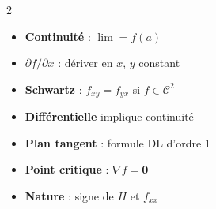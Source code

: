 \documentclass[10pt,a4paper]{article}
\begin{document}
\begin{multicols}{2}
\begin{grisbox}
\begin{itemize}[leftmargin=1em,itemsep=2pt]
  \item \textbf{Continuité} : $\lim = f(a)$
  \item \textbf{$\partial f/\partial x$} : dériver en $x$, $y$ constant
  \item \textbf{Schwartz} : $f_{xy}=f_{yx}$ si $f\in\mathcal{C}^2$
  \item \textbf{Différentielle} implique continuité
  \item \textbf{Plan tangent} : formule DL d'ordre 1
  \item \textbf{Point critique} : $\nabla f=\mathbf{0}$
  \item \textbf{Nature} : signe de $H$ et $f_{xx}$
\end{itemize}
\end{grisbox}

\end{multicols}
\end{document}
